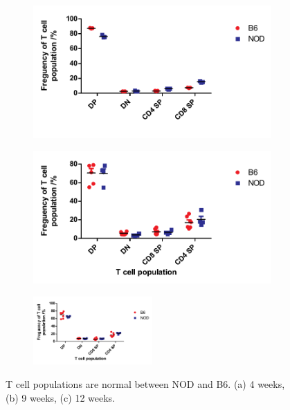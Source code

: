 \begin{figure}
	\begin{subfigure}{0.5\textwidth}
	\includegraphics[width=\textwidth]{Figures/4wkThyTcells.pdf}
	\caption{}
	\label{subfig:4wkThyTcells}
	\end{subfigure}
	\begin{subfigure}{0.5\textwidth}
 	\includegraphics[width=\textwidth]{Figures/9wkThyTcells.pdf}
	\caption{}
	\label{subfig:9wkThyTcells}
	\end{subfigure}
	\begin{subfigure}{\textwidth}
	\centering
 	\includegraphics[width=0.5\textwidth]{Figures/12wkThyTcells.pdf}
	\caption{}
	\label{subfig:12wkThyTcells}
	\end{subfigure}
\caption{T cell populations are normal between NOD and B6. (a) 4 weeks, (b) 9 weeks, (c) 12 weeks.}
\label{fig:NODB6Tcells}
\end{figure}

